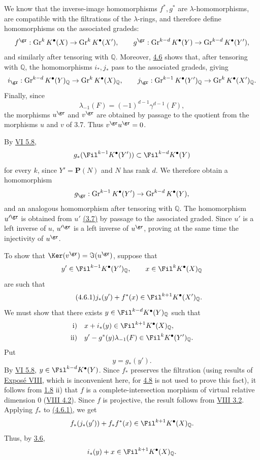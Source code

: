 We know that the inverse-image homomorphisms \(f^*,g^*\) are \(\lambda\)-homomorphisms, are compatible with the filtrations of the \(\lambda\)-rings, and therefore define homomorphisms on the associated gradeds:
\[
  f^{\gr}:\operatorname{Gr}^kK^\bullet(X)\to\operatorname{Gr}^kK^\bullet(X'),
  \qquad
  g^{\gr}:\operatorname{Gr}^{k-d}K^\bullet(Y)\to\operatorname{Gr}^{k-d}K^\bullet(Y'),
\]
and similarly after tensoring with \(\mathbb Q\). Moreover, \hyperlink{sga6.e07.thm.4-6}{4.6} shows that, after tensoring with \(\mathbb Q\), the homomorphisms \(i_*,j_*\) pass to the associated gradeds, giving
\[
  i_{\gr}:\operatorname{Gr}^{k-d}K^\bullet(Y)_{\mathbb Q}
  \to \operatorname{Gr}^{k}K^\bullet(X)_{\mathbb Q},
  \qquad
  j_{\gr}:\operatorname{Gr}^{k-1}K^\bullet(Y')_{\mathbb Q}
  \to \operatorname{Gr}^{k}K^\bullet(X')_{\mathbb Q}.
\]
Finally, since
\[
  \lambda_{-1}(F)=(-1)^{d-1}\gamma^{d-1}(F),
\]
the morphisms \(u^{\gr}\) and \(v^{\gr}\) are obtained by passage to the quotient from the morphisms \(u\) and \(v\) of 3.7. Thus \(v^{\gr}u^{\gr}=0\).

By \hyperlink{sga6.e06.cor.5-8}{VI 5.8},
\[
  g_*(\Fil^{k-1}K^\bullet(Y'))\subset \Fil^{k-d}K^\bullet(Y)
\]
for every \(k\), since \(Y'=\mathbf P(N)\) and \(N\) has rank \(d\). We therefore obtain a homomorphism
\[
  g_{\gr}:\operatorname{Gr}^{k-1}K^\bullet(Y')
  \to\operatorname{Gr}^{k-d}K^\bullet(Y),
\]
and an analogous homomorphism after tensoring with \(\mathbb Q\). The homomorphism \(u'^{\gr}\) is obtained from \(u'\) \hyperlink{sga6.e07.thm.3-7}{(3.7)} by passage to the associated graded. Since \(u'\) is a left inverse of \(u\), \(u'^{\gr}\) is a left inverse of \(u^{\gr}\), proving at the same time the injectivity of \(u^{\gr}\).

To show that \(\Ker(v^{\gr})=\Im(u^{\gr})\), suppose that
\[
y'\in\Fil^{k-1}K^\bullet(Y')_{\mathbb Q},\qquad
x\in\Fil^kK^\bullet(X)_{\mathbb Q}
\]
are such that
\begin{equation}\tag{4.6.1}
  j_*(y')+f^*(x)\in\Fil^{k+1}K^\bullet(X')_{\mathbb Q}.
\end{equation}
We must show that there exists \(y\in\Fil^{k-d}K^\bullet(Y)_{\mathbb Q}\) such that
\[
\begin{aligned}
\text{i)}\quad &x+i_*(y)\in\Fil^{k+1}K^\bullet(X)_{\mathbb Q},\\
\text{ii)}\quad &y'-g^*(y)\lambda_{-1}(F)\in\Fil^{k}K^\bullet(Y')_{\mathbb Q}.
\end{aligned}
\]
Put
\[
  y=g_*(y').
\]
By \hyperlink{sga6.e06.cor.5-8}{VI 5.8}, \(y\in\Fil^{k-d}K^\bullet(Y)\). Since \(f_*\) preserves the filtration (using results of \hyperlink{sga6.e08.expose}{Exposé VIII}, which is inconvenient here, for \hyperlink{sga6.e07.thm.4-8}{4.8} is not used to prove this fact), it follows from \hyperlink{sga6.e07.prop.1-8}{1.8} ii) that \(f\) is a complete-intersection morphism of virtual relative dimension \(0\) (\hyperlink{sga6.e08.prop.4-2}{VIII 4.2}). Since \(f\) is projective, the result follows from \hyperlink{sga6.e08.prop.3-2}{VIII 3.2}. Applying \(f_*\) to \hyperlink{sga6.e07.eq.4-6-1}{(4.6.1)}, we get
\[
  f_*(j_*(y'))+f_*f^*(x)\in\Fil^{k+1}K^\bullet(X)_{\mathbb Q}.
\]
Thus, by \hyperlink{sga6.e07.prop.3-6}{3.6},
\[
  i_*(y)+x\in\Fil^{k+1}K^\bullet(X)_{\mathbb Q}.
\]

